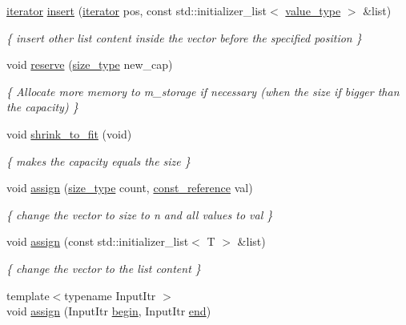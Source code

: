 \begin{DoxyCompactItemize}
\hyperlink{classMyIterator}{iterator} \hyperlink{classvector_aa739fea25af5e923d1408118a6905ab0}{insert} (\hyperlink{classMyIterator}{iterator} pos, const std\+::initializer\+\_\+list$<$ \hyperlink{classvector_a734f2f7bdca203914356632292c0c596}{value\+\_\+type} $>$ \&list)
\begin{DoxyCompactList}\small\item\em \{ insert other list content inside the vector before the specified position \} \end{DoxyCompactList}\item 
void \hyperlink{classvector_a18b85e038e6237174c9bd76ffd034d66}{reserve} (\hyperlink{classvector_a4d06f3ade0c2ac023b7a7edb85d9d1ef}{size\+\_\+type} new\+\_\+cap)
\begin{DoxyCompactList}\small\item\em \{ Allocate more memory to m\+\_\+storage if necessary (when the size if bigger than the capacity) \} \end{DoxyCompactList}\item 
\mbox{\label{classvector_abdcf23a0562246e1ec6fe6d10237ae4d}} 
void \hyperlink{classvector_abdcf23a0562246e1ec6fe6d10237ae4d}{shrink\+\_\+to\+\_\+fit} (void)
\begin{DoxyCompactList}\small\item\em \{ makes the capacity equals the size \} \end{DoxyCompactList}\item 
void \hyperlink{classvector_a9fa84fecacbe2ac4861c2e7db19047e0}{assign} (\hyperlink{classvector_a4d06f3ade0c2ac023b7a7edb85d9d1ef}{size\+\_\+type} count, \hyperlink{classvector_aad263433b4072dfbc26ace0df6441960}{const\+\_\+reference} val)
\begin{DoxyCompactList}\small\item\em \{ change the vector to size to n and all values to val \} \end{DoxyCompactList}\item 
void \hyperlink{classvector_a31411e4da5fa0fa860aec7377639344e}{assign} (const std\+::initializer\+\_\+list$<$ T $>$ \&list)
\begin{DoxyCompactList}\small\item\em \{ change the vector to the list content \} \end{DoxyCompactList}\item 
{\footnotesize template$<$typename Input\+Itr $>$ }\\void \hyperlink{classvector_af44f287e086f504b0ec06ffe8cdf96e3}{assign} (Input\+Itr \hyperlink{classvector_a22ebe2c584d5e94106e10eef4e8d7baa}{begin}, Input\+Itr \hyperlink{classvector_aad5e92e775a9fa4f98b5b0666b6c0e2d}{end})

\end{DoxyCompactItemize}
